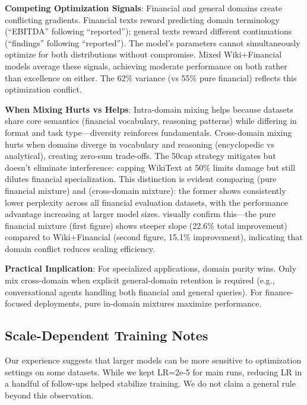 \textbf{Competing Optimization Signals}: Financial and general domains create conflicting gradients. Financial texts reward predicting domain terminology (``EBITDA'' following ``reported''); general texts reward different continuations (``findings'' following ``reported''). The model's parameters cannot simultaneously optimize for both distributions without compromise. Mixed Wiki+Financial models average these signals, achieving moderate performance on both rather than excellence on either. The 62\% variance (vs 55\% pure financial) reflects this optimization conflict.

\textbf{When Mixing Hurts vs Helps}: Intra-domain mixing helps because datasets share core semantics (financial vocabulary, reasoning patterns) while differing in format and task type—diversity reinforces fundamentals. Cross-domain mixing hurts when domains diverge in vocabulary and reasoning (encyclopedic vs analytical), creating zero-sum trade-offs. The 50cap strategy mitigates but doesn't eliminate interference: capping WikiText at 50\% limits damage but still dilutes financial specialization. This distinction is evident comparing  (pure financial mixture) and  (cross-domain mixture): the former shows consistently lower perplexity across all financial evaluation datasets, with the performance advantage increasing at larger model sizes.  visually confirm this—the pure financial mixture (first figure) shows steeper slope (22.6\% total improvement) compared to Wiki+Financial (second figure, 15.1\% improvement), indicating that domain conflict reduces scaling efficiency.

\textbf{Practical Implication}: For specialized applications, domain purity wins. Only mix cross-domain when explicit general-domain retention is required (e.g., conversational agents handling both financial and general queries). For finance-focused deployments, pure in-domain mixtures maximize performance.

\subsection{Scale-Dependent Training Notes}

Our experience suggests that larger models can be more sensitive to optimization settings on some datasets. While we kept LR=2e-5 for main runs, reducing LR in a handful of follow-ups helped stabilize training. We do not claim a general rule beyond this observation.

